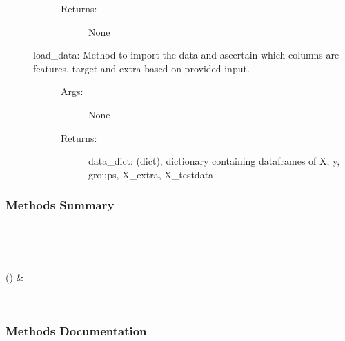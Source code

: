 \documentclass[letterpaper,10pt,english]{sphinxmanual}
\begin{document}
\begin{fulllineitems}
\begin{description}
\begin{description}
\begin{description}
\item[{Returns:}] \leavevmode
None

\end{description}

\item[{load\_data: Method to import the data and ascertain which columns are features, target and extra based on provided input.}] \leavevmode\begin{description}
\item[{Args:}] \leavevmode
None

\item[{Returns:}] \leavevmode
data\_dict: (dict), dictionary containing dataframes of X, y, groups, X\_extra, X\_testdata

\end{description}

\end{description}

\end{description}
\subsubsection*{Methods Summary}


\begin{savenotes}\sphinxatlongtablestart\begin{longtable}[c]{}
\hline

\endfirsthead

%
{}\\
\hline

\endhead

\hline
{}\\
\endfoot

\endlastfoot

{\hyperref[\detokenize{api/mastml.datasets.LocalDatasets:mastml.datasets.LocalDatasets.load_data}]{}}()
&

\\
\hline
\end{longtable}\sphinxatlongtableend\end{savenotes}
\subsubsection*{Methods Documentation}

\begin{fulllineitems}
\label{\detokenize{api/mastml.datasets.LocalDatasets:mastml.datasets.LocalDatasets.load_data}}
\end{fulllineitems}


\end{fulllineitems}
\end{document}
